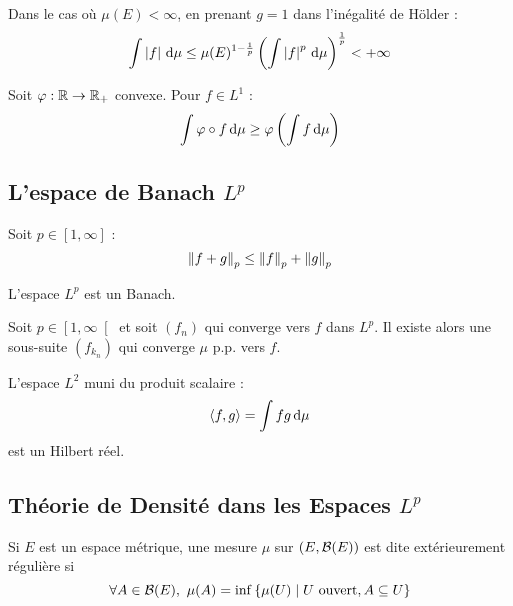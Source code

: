 \documentclass{cours}
\begin{document}
\begin{remark}
    Dans le cas où $\mu(E)< \infty$, en prenant $g = 1$ dans l'inégalité de Hölder :
    \[
        \int \left|f\right| {\rm \, d} \mu \leq \mu(E)^{1 - \frac{1}{p}} \left(\int \left|f\right|^{p} {\rm \, d}\mu\right)^{\frac{1}{p}} < + \infty
    \]
\end{remark}

\begin{proposition}
    Soit $\varphi : \mathbb{R} \rightarrow \mathbb{R}_{+}$ convexe. Pour $f \in L^{1}$ :
    \[
        \int \varphi \circ f {\rm \, d}\mu \geq \varphi \left(\int f {\rm \, d}\mu\right)
    \]
\end{proposition}

\subsection{L'espace de Banach $L^{p}$}
\begin{proposition}
    Soit $p \in \left[1, \infty\right]$ :
    \[
        \left\lVert f + g \right\rVert_{p} \leq \left\lVert f \right\rVert_{p} + \left\lVert g \right\rVert_{p}
    \]
\end{proposition}
\begin{theorem}
    L'espace $L^{p}$ est un Banach.
\end{theorem}

\begin{proposition}
    Soit $p \in \left[1, \infty\right[$ et soit $(f_{n})$ qui converge vers $f$ dans $L^{p}$. Il existe alors une sous-suite $\left(f_{k_{n}}\right)$ qui converge $\mu$ p.p. vers $f$.
\end{proposition}

\begin{proposition}
    L'espace $L^{2}$ muni du produit scalaire :
    \[
        \left\langle f, g \right\rangle = \int fg {\rm \, d}\mu
    \]
    est un Hilbert réel.
\end{proposition}

\subsection{Théorie de Densité dans les Espaces $L^{p}$}
\begin{definition}
    Si $E$ est un espace métrique, une mesure $\mu$ sur $\left(E, \mathcal{B}(E)\right)$ est dite extérieurement régulière si
    \[
        \forall A \in \mathcal{B}(E), \ \mu(A) = \inf \left\{\mu(U) \mid U \text{ ouvert}, A \subseteq U\right\}
    \]
\end{definition}
\end{document}
